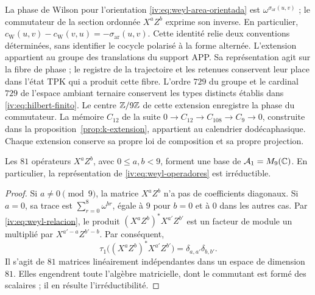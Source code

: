 La phase de Wilson pour l’orientation
\eqref{iv:eq:weyl-area-orientada} est
\(\omega^{\sigma_{\mathrm{ar}}(u,v)}\) ; le commutateur de la
section ordonnée \(X^aZ^b\) exprime son inverse. En particulier,
\(c_{\mathrm W}(u,v)-c_{\mathrm W}(v,u)
=-\sigma_{\mathrm{ar}}(u,v)\).
Cette identité relie deux conventions déterminées, sans identifier
le cocycle polarisé à la forme alternée. L’extension appartient
au groupe des translations du support APP. Sa représentation agit sur
la fibre de phase ; le registre de la trajectoire et les retenues conservent
leur place dans l’état TPK qui a produit cette fibre. L’ordre \(729\)
du groupe et le cardinal \(729\) de l’espace ambiant ternaire conservent les
types distincts établis dans \eqref{iv:eq:hilbert-finito}.
Le centre \(\mathbb Z/9\mathbb Z\) de cette extension enregistre la phase
du commutateur. La mémoire \(C_{12}\) de la suite
\(0\to C_{12}\to C_{108}\to C_9\to0\), construite dans la
proposition~\ref{prop:k-extension}, appartient au calendrier
dodécaphasique. Chaque extension conserve sa propre loi de composition et
sa propre projection.

\begin{proposition}
\label{iv:prop:weyl-completo}
Les \(81\) opérateurs \(X^aZ^b\), avec \(0\leq a,b<9\), forment
une base de \(\mathcal A_1=M_9(\mathbb C)\). En particulier, la
représentation de \eqref{iv:eq:weyl-operadores} est irréductible.
\end{proposition}
\begin{proof}
Si \(a\neq0\pmod9\), la matrice \(X^aZ^b\) n’a pas de coefficients
diagonaux. Si \(a=0\), sa trace est
\(\sum_{r=0}^8\omega^{br}\), égale à \(9\) pour \(b=0\) et à
\(0\) dans les autres cas. Par \eqref{iv:eq:weyl-relacion}, le
produit \((X^aZ^b)^*X^{a'}Z^{b'}\) est un facteur de module un
multiplié par \(X^{a'-a}Z^{b'-b}\). Par conséquent,
\[
 \tau_1\bigl((X^aZ^b)^*X^{a'}Z^{b'}\bigr)
 =\delta_{a,a'}\delta_{b,b'}.
\]
Il s'agit de \(81\) matrices linéairement indépendantes dans un espace de dimension \(81\). Elles engendrent toute l'algèbre matricielle, dont le commutant est formé des scalaires ; il en résulte l'irréductibilité.
\end{proof}

